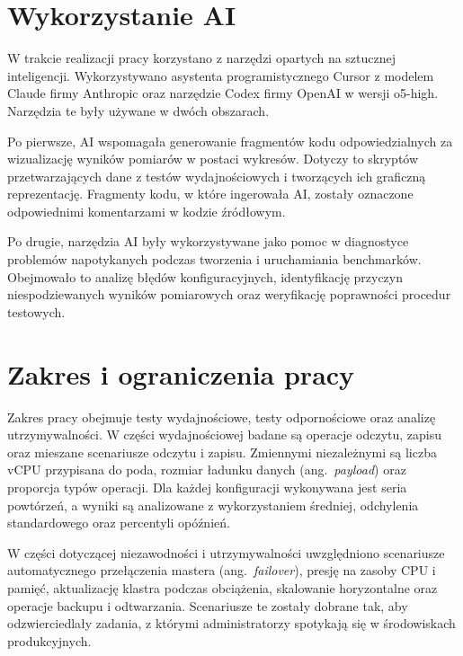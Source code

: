 \section{Wykorzystanie AI}

W trakcie realizacji pracy korzystano z narzędzi opartych na sztucznej inteligencji. Wykorzystywano asystenta programistycznego Cursor z modelem Claude firmy Anthropic oraz narzędzie Codex firmy OpenAI w wersji o5-high. Narzędzia te były używane w dwóch obszarach.

Po pierwsze, AI wspomagała generowanie fragmentów kodu odpowiedzialnych za wizualizację wyników pomiarów w postaci wykresów. Dotyczy to skryptów przetwarzających dane z testów wydajnościowych i tworzących ich graficzną reprezentację. Fragmenty kodu, w które ingerowała AI, zostały oznaczone odpowiednimi komentarzami w kodzie źródłowym.

Po drugie, narzędzia AI były wykorzystywane jako pomoc w diagnostyce problemów napotykanych podczas tworzenia i uruchamiania benchmarków. Obejmowało to analizę błędów konfiguracyjnych, identyfikację przyczyn niespodziewanych wyników pomiarowych oraz weryfikację poprawności procedur testowych.

\section{Zakres i ograniczenia pracy}

Zakres pracy obejmuje testy wydajnościowe, testy odpornościowe oraz analizę utrzymywalności. W części wydajnościowej badane są operacje odczytu, zapisu oraz mieszane scenariusze odczytu i zapisu. Zmiennymi niezależnymi są liczba vCPU przypisana do poda, rozmiar ładunku danych (ang.~\textit{payload}) oraz proporcja typów operacji. Dla każdej konfiguracji wykonywana jest seria powtórzeń, a wyniki są analizowane z wykorzystaniem średniej, odchylenia standardowego oraz percentyli opóźnień.

W części dotyczącej niezawodności i utrzymywalności uwzględniono scenariusze automatycznego przełączenia mastera (ang.~\textit{failover}), presję na zasoby CPU i pamięć, aktualizację klastra podczas obciążenia, skalowanie horyzontalne oraz operacje backupu i odtwarzania. Scenariusze te zostały dobrane tak, aby odzwierciedlały zadania, z którymi administratorzy spotykają się w środowiskach produkcyjnych.

